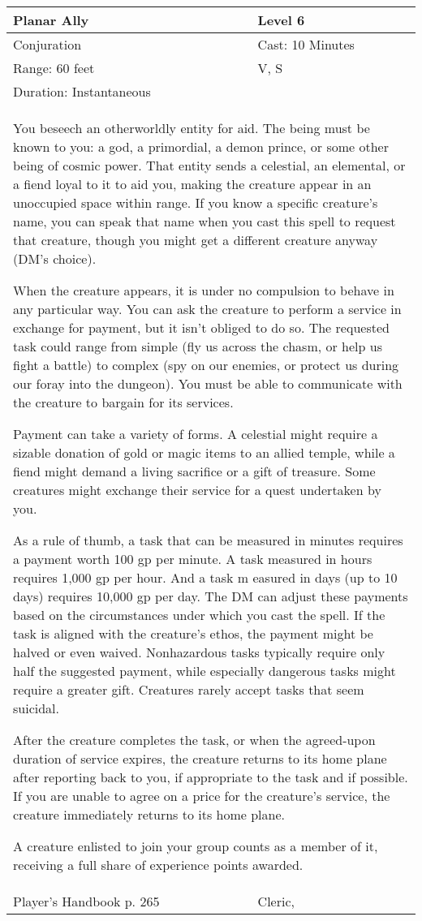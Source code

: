 \documentclass[11pt]{report}
\begin{document}
\begin{table}[H]
	\begin{tabular}{||p{6cm}|p{6cm}||}
		\hline\hline
		\bf{Planar Ally} & Level 6\\ \hline
		Conjuration & Cast: 10 Minutes\\ \hline
		Range: 60 feet & V, S\\ \hline
		Duration: Instantaneous & \\ \hline
		\multicolumn{2}{||p{12cm}||}{You beseech an otherworldly entity for aid.
The being must be known to you: a god, a primordial, a demon prince, or some other being of cosmic power. That entity sends a celestial, an elemental, or a fiend loyal to it to aid you, making the creature appear in an unoccupied space within range. If you know a specific creature’s name, you can speak that name when you cast this spell to request that creature, though you might get a different creature anyway (DM’s choice).

When the creature appears, it is under no compulsion to behave in any particular way. You can ask the creature to perform a service in exchange for payment, but it isn’t obliged to do so. The requested task could range from simple (fly us across the chasm, or help us fight a battle) to complex (spy on our enemies, or protect us during our foray into the dungeon). You must be able to communicate with the creature to bargain for its services.

Payment can take a variety of forms. A celestial might require a sizable donation of gold or magic items to an allied temple, while a fiend might demand a living sacrifice or a gift of treasure. Some creatures might exchange their service for a quest undertaken by you.

As a rule of thumb, a task that can be measured in minutes requires a payment worth 100 gp per minute. A task measured in hours requires 1,000 gp per hour. And a task m easured in days (up to 10 days) requires 10,000 gp per day. The DM can adjust these payments based on the circumstances under which you cast the spell. If the task is aligned with the creature’s ethos, the payment might be halved or even waived. Nonhazardous tasks typically require only half the suggested payment, while especially dangerous tasks might require a greater gift. Creatures rarely accept tasks that seem suicidal.

After the creature completes the task, or when the agreed-upon duration of service expires, the creature returns to its home plane after reporting back to you, if appropriate to the task and if possible. If you are unable to agree on a price for the creature’s service, the creature immediately returns to its home plane.

A creature enlisted to join your group counts as a member of it, receiving a full share of experience points awarded.}\\ \hline
Player's Handbook p. 265 & Cleric, \\ \hline\hline
	\end{tabular}
\end{table}
\end{document}
